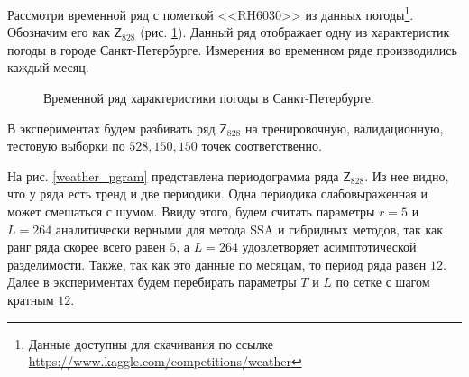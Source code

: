 \documentclass[specialist,
               substylefile = spbu.rtx,
               subf,href,colorlinks=true, 12p]{disser}
\begin{document}
Рассмотри временной ряд с пометкой <<RH6030>> из данных погоды\footnote{Данные доступны для скачивания по ссылке \url{https://www.kaggle.com/competitions/weather} }. Обозначим его как $\mathsf{Z}_{828}$ (рис. \ref{weather_graph}). Данный ряд отображает одну из характеристик погоды в городе Санкт-Петербурге. Измерения во временном ряде производились каждый месяц.

\begin{figure}[H]
	\caption{Временной ряд характеристики погоды в Санкт-Петербурге.}
	\label{weather_graph}
\end{figure}

В экспериментах будем разбивать ряд $\mathsf{Z}_{828}$ на тренировочную, валидационную, тестовую выборки по $528, 150, 150$ точек соответственно.

На рис. \ref{weather_pgram} представлена периодограмма ряда $\mathsf{Z}_{828}$. Из нее видно, что у ряда есть тренд и две периодики. Одна периодика слабовыраженная и может смешаться с шумом. Ввиду этого, будем считать параметры $r=5$ и $L = 264$ аналитически верными для метода SSA и гибридных методов, так как ранг ряда скорее всего равен $5$, а $L = 264$ удовлетворяет асимптотической разделимости. Также, так как это данные по месяцам, то период ряда равен $12$. Далее в экспериментах будем перебирать параметры $T$ и $L$ по сетке с шагом кратным $12$.
\end{document}
